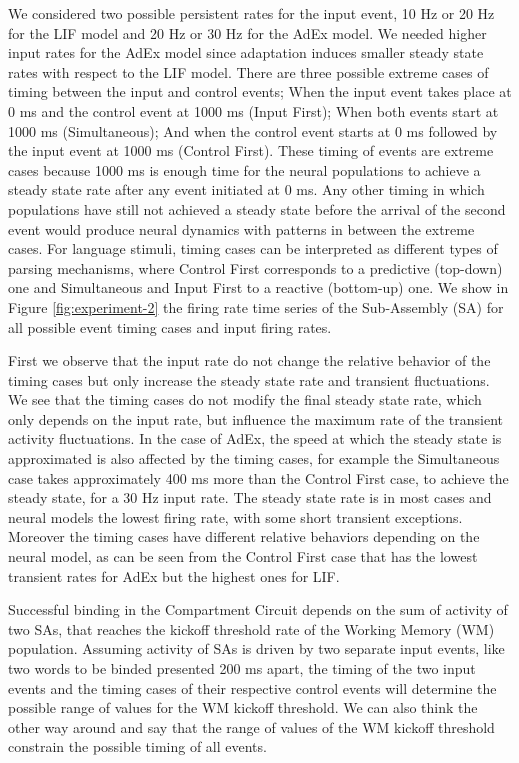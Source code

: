 \documentclass[10pt]{article}
\begin{document}
We considered two possible persistent rates for the input event, 10 Hz or 20 Hz for the LIF model and 20 Hz or 30 Hz for the AdEx model.
We needed higher input rates for the AdEx model since adaptation induces smaller steady state rates with respect to the LIF model.
There are three possible extreme cases of timing between the input and control events;
When the input event takes place at 0 ms and the control event at 1000 ms (Input First);
When both events start at 1000 ms (Simultaneous);
And when the control event starts at 0 ms followed by the input event at 1000 ms (Control First).
These timing of events are extreme cases because 1000 ms is enough time for the neural populations to achieve a steady state rate after any event initiated at 0 ms.
Any other timing in which populations have still not achieved a steady state before the arrival of the second event would produce neural dynamics with patterns in between the extreme cases.
For language stimuli, timing cases can be interpreted as different types of parsing mechanisms, where Control First corresponds to a predictive (top-down) one and Simultaneous and Input First to a reactive (bottom-up) one.
We show in Figure \ref{fig:experiment-2} the firing rate time series of the Sub-Assembly (SA) for all possible event timing cases and input firing rates.

First we observe that the input rate do not change the relative behavior of the timing cases but only increase the steady state rate and transient fluctuations.
We see that the timing cases do not modify the final steady state rate, which only depends on the input rate, but influence the maximum rate of the transient activity fluctuations.
In the case of AdEx, the speed at which the steady state is approximated is also affected by the timing cases, for example the Simultaneous case takes approximately 400 ms more than the Control First case, to achieve the steady state, for a 30 Hz input rate.
The steady state rate is in most cases and neural models the lowest firing rate, with some short transient exceptions.
Moreover the timing cases have different relative behaviors depending on the neural model, as can be seen from the Control First case that has the lowest transient rates for AdEx but the highest ones for LIF.

Successful binding in the Compartment Circuit depends on the sum of activity of two SAs, that reaches the kickoff threshold rate of the Working Memory (WM) population.
Assuming activity of SAs is driven by two separate input events, like two words to be binded presented 200 ms apart, the timing of the two input events and the timing cases of their respective control events will determine the possible range of values for the WM kickoff threshold.
We can also think the other way around and say that the range of values of the WM kickoff threshold constrain the possible timing of all events.
\end{document}
